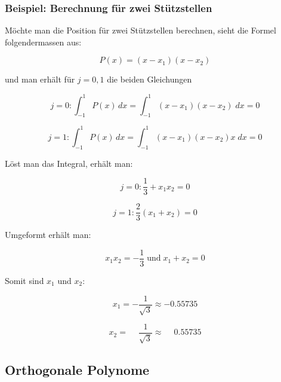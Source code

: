 \subsubsection{Beispiel: Berechnung für zwei Stützstellen}
Möchte man die Position für zwei Stützstellen berechnen, sieht die Formel folgendermassen aus:

\begin{equation}
    P(x) = (x - x_{1})(x - x_{2})
\end{equation}

und man erhält für $j = 0,1$ die beiden Gleichungen

\begin{equation*}
    j = 0: 
    \int_{-1}^{1}P(x)\,dx 
    = 
    \int_{-1}^{1}(x - x_{1})(x - x_{2}) \; dx = 0
\end{equation*}

\begin{equation*}
    j = 1: 
    \int_{-1}^{1}P(x)\,dx 
    = 
    \int_{-1}^{1}(x - x_{1})(x - x_{2})x \; dx = 0
\end{equation*}

Löst man das Integral, erhält man:

\begin{equation*}
    j=0:
    \frac{1}{3} + x_{1}x_{2} = 0
\end{equation*}

\begin{equation}
    j=1: 
    \frac{2}{3}(x_{1}+x_{2}) = 0
\end{equation}

Umgeformt erhält man:

\begin{equation}
    x_{1}x_{2} = -\frac{1}{3}
    \;
    \text{und}
    \;
    x_{1}+x_{2} = 0
\end{equation}

Somit sind $ x_{1} $ und $ x_{2} $:

\begin{equation*}
    x_{1} = -\frac{1}{\sqrt{3}} \approx -0.55735
\end{equation*}

\begin{equation}
    x_{2} = \phantom{-} \frac{1}{\sqrt{3}} \approx \phantom{-}0.55735
\end{equation}

\subsection{Orthogonale Polynome
\label{quadratur:subsection:orthogonalepolynome}}

